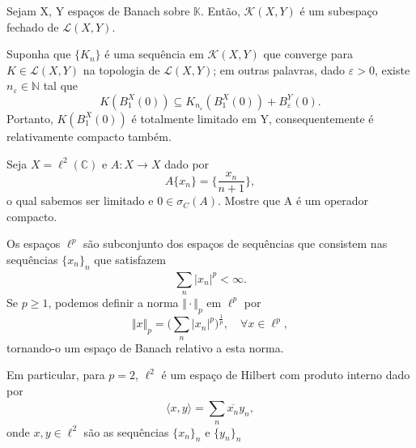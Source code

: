 \documentclass[../functional_analysis.tex]{subfiles}
\begin{document}
\begin{theorem*}
	Sejam X, Y espaços de Banach sobre \(\mathbb{K}.\) Então, \(\mathcal{K}(X, Y)\) é um subespaço fechado de \(\mathcal{L}(X, Y)\).
\end{theorem*}
\begin{proof*}
	Suponha que \(\{K_{n}\}\) é uma sequência em \(\mathcal{K}(X, Y)\) que converge para \(K\in \mathcal{L}(X, Y)\) na topologia de \(\mathcal{L}(X, Y)\);
	em outras palavras, dado \(\varepsilon >0\), existe \(n_{\varepsilon }\in \mathbb{N}\) tal que
	\[
		K(B_{1}^{X}(0))\subseteq K_{n_\varepsilon }(B_{1}^{X}(0)) + B_{\varepsilon }^{Y}(0).
	\]
	Portanto, \(K(B_{1}^{X}(0))\) é totalmente limitado em Y, consequentemente é relativamente compacto também. \qedsymbol
\end{proof*}
\begin{exr}
	Seja \(X = \ell^{2}(\mathbb{C})\) e \(A:X\rightarrow X\) dado por
	\[
		A\{x_{n}\}=\biggl\{\frac{x_{n}}{n+1}\biggr\},
	\]
	o qual sabemos ser limitado e \(0\in \sigma_{C}(A)\). Mostre que A é um operador compacto.
\end{exr}
\begin{tcolorbox}[
		skin=enhanced,
		title=Lembrete!,
		after title={\hfill Espaços \(\ell^{p}\)},
		fonttitle=\bfseries,
		sharp corners=downhill,
		colframe=black,
		colbacktitle=yellow!75!white,
		colback=yellow!30,
		colbacklower=black,
		coltitle=black,
		drop large lifted shadow
	]
	Os espaços \(\ell^{p}\) são subconjunto dos espaços de sequências que consistem nas sequências \(\{x_{n}\}_{n}\) que satisfazem
	\[
		\sum\limits_{n}^{}| x_{n} |^{p}<\infty.
	\]
	Se \(p\geq 1\), podemos definir a norma \(\Vert \cdot  \Vert_{p}\) em \(\ell^{p}\) por
	\[
		\Vert x \Vert_{p}=\biggl(\sum\limits_{n}^{}| x_{n} |^{p}\biggr)^{\frac{1}{p}},\quad \forall x\in \ell^{p},
	\]
	tornando-o um espaço de Banach relativo a esta norma.

	Em particular, para \(p=2\), \(\ell^{2}\) é um espaço de Hilbert com produto interno dado por
	\[
		\langle x, y \rangle=\sum\limits_{n}^{}\overline{x_{n}}y_{n},
	\]
	onde \(x, y\in \ell^{2}\) são as sequências \(\{x_{n}\}_{n}\) e \(\{y_{n}\}_{n}\)
\end{tcolorbox}
\end{document}
